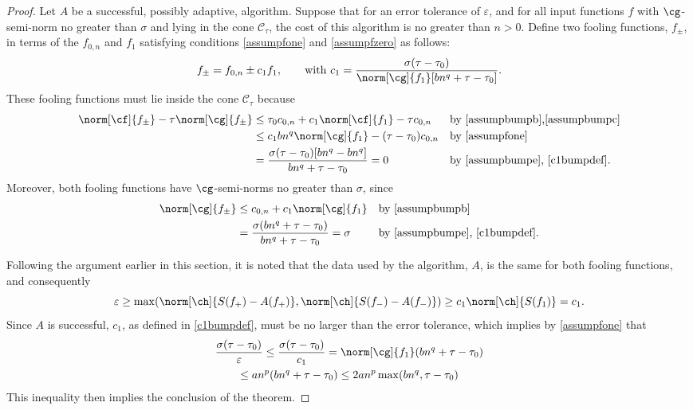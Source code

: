 \documentclass[final]{elsarticle}
\newcommand{\cc}{\mathcal{C}}
\theoremstyle{definition}
\theoremstyle{remark}
\begin{document}
\begin{proof} Let $A$ be a successful, possibly adaptive, algorithm.  Suppose that for an error tolerance of $\varepsilon$, and for all input functions $f$ with $\cg$-semi-norm no greater than $\sigma$ and lying in the cone  $\cc_{\tau}$, the cost of this algorithm is no greater than $n>0$.  Define two fooling functions, $f_{\pm}$, in terms of the $f_{0,n}$ and $f_1$ satisfying conditions \eqref{assumpfone} and \eqref{assumpfzero} as follows:
\begin{equation} \label{c1bumpdef}
f_{\pm} =f_{0,n} \pm c_1 f_1, \qquad \text{with } c_1= \frac{\sigma (\tau-\tau_0)}{\norm[\cg]{f_1} [b n^q + \tau - \tau_0]}.
\end{equation}
These fooling functions must lie inside the cone $\cc_{\tau}$ because
\begin{align*}
\norm[\cf]{f_{\pm}} - \tau  \norm[\cg]{f_{\pm}} & \le \tau_0 c_{0,n} + c_1 \norm[\cf]{f_1} - \tau c_{0,n}
&& \text{by \eqref{assumpbumpb},\eqref{assumpbumpc}} \\
& \le c_1 b n^{q} \norm[\cg]{f_1} - (\tau - \tau_0) c_{0,n} && \text{by \eqref{assumpfone}} \\
& = \frac{\sigma (\tau - \tau_0) [b n^q - b n^q ] }{b n^q + \tau - \tau_0} = 0 && \text{by \eqref{assumpbumpe}, \eqref{c1bumpdef}}.
\end{align*}
Moreover, both fooling functions have $\cg$-semi-norms no greater than $\sigma$, since
\begin{align*}
\norm[\cg]{f_{\pm}} & \le c_{0,n} + c_1 \norm[\cg]{f_1}
&& \text{by \eqref{assumpbumpb}} \\
& = \frac{\sigma(b n^q + \tau- \tau_0) }{b n^q + \tau- \tau_0} =\sigma && \text{by \eqref{assumpbumpe}, \eqref{c1bumpdef}.}
\end{align*}

Following the argument earlier in this section, it is noted that the data used by the algorithm, $A$, is the same for both fooling functions, and consequently 
\[
\varepsilon  \ge  \max(\norm[\ch]{S(f_+)-A(f_+)},\norm[\ch]{S(f_-)-A(f_-)}) \ge c_1 \norm[\ch]{S(f_1)}=c_1.
\]
Since $A$ is successful, $c_1$, as defined in \eqref{c1bumpdef}, must be no larger than the error tolerance, which implies by \eqref{assumpfone} that 
\begin{multline*}
\frac{\sigma (\tau-\tau_0)}{\varepsilon} \le \frac{\sigma (\tau-\tau_0)}{c_1}  = \norm[\cg]{f_1} (b n^q + \tau-\tau_0) \\
\le a n^{p} (b n^q + \tau-\tau_0) \le 2 a n^{p} \max( b n^{q}, \tau-\tau_0) 
\end{multline*}
This inequality then implies the conclusion of the theorem.   
\end{proof}
\end{document}
